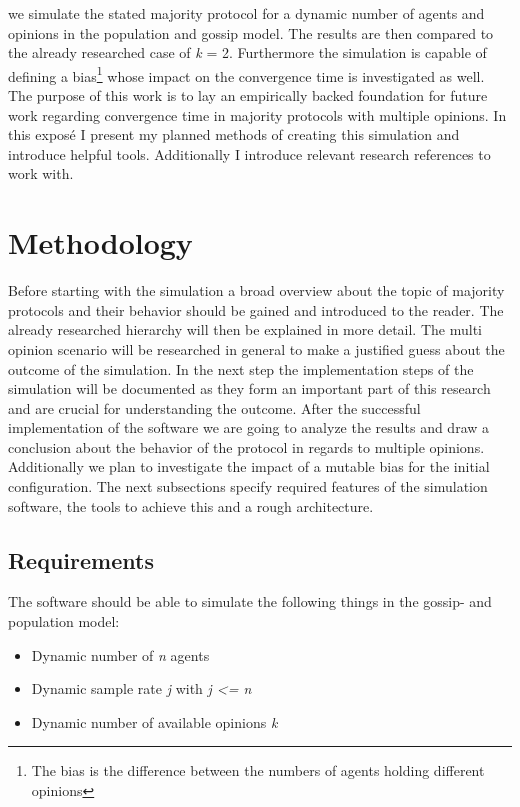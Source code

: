 \documentclass{thesis}
\begin{document}
we simulate the stated majority protocol for a dynamic number of agents and
opinions in the population and gossip model. The results are
then compared to the already researched case of \textit{k} = 2. Furthermore the
simulation is capable of defining a bias\footnote{The bias is the difference
between the numbers of agents holding different opinions} whose impact on the
convergence time is investigated as well. The purpose of this work is to lay
an empirically backed foundation for future work regarding convergence time in
majority protocols with multiple opinions.
\newline
In this exposé I present my planned methods of creating this simulation and
introduce helpful tools. Additionally I introduce relevant research references
to work with.

\section{Methodology}
Before starting with the simulation a broad overview about the topic of majority
protocols and their behavior should be gained and introduced to the reader.
The already researched hierarchy will then be explained in more detail. The
multi opinion scenario will be researched in general to make a justified guess
about the outcome of the simulation. In the next step the implementation steps
of the simulation will be documented as they form an important part of this
research and are crucial for understanding the outcome. After the successful
implementation of the software we are going to analyze the results and draw a
conclusion about the behavior of the protocol in regards to multiple opinions.
Additionally we plan to investigate the impact of a mutable bias for the initial
configuration.
\newline
The next subsections specify required features of the simulation software, the
tools to achieve this and a rough architecture.

\subsection{Requirements}
The software should be able to simulate the following things in the gossip- and
population model:

\begin{itemize}
\item Dynamic number of \textit{n} agents
\item Dynamic sample rate \textit{j} with \textit{j <= n}
\item Dynamic number of available opinions \textit{k}
\end{itemize}
\end{document}
